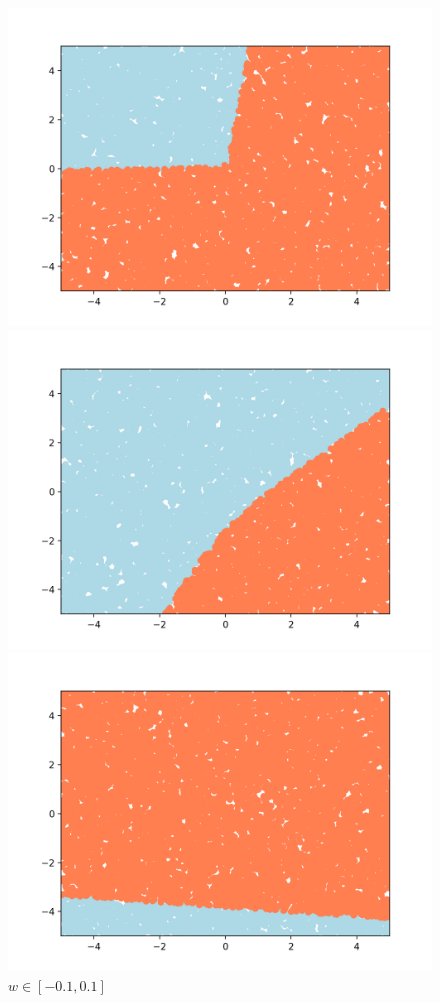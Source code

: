\documentclass[12pt]{article}
\begin{document}
\begin{figure}[H]
  \includegraphics[width=\linewidth]{fig/fig_p23_1.png}
  \caption{$w \in [-10, 10]$}
\endminipage\hfill
{}
  \includegraphics[width=\linewidth]{fig/fig_p23_2.png}
  \caption{$w \in [-3, 3]$}
\endminipage\hfill
{}%
  \includegraphics[width=\linewidth]{fig/fig_p23_3.png}
  \caption{$w \in [-0.1, 0.1]$}
\endminipage
\end{figure}
\end{document}
